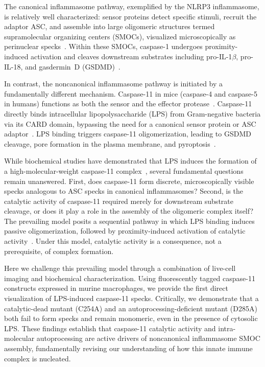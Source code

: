 \documentclass[11pt,a4paper]{article}
\begin{document}
The canonical inflammasome pathway, exemplified by the NLRP3 inflammasome, is relatively well characterized: sensor proteins detect specific stimuli, recruit the adaptor ASC, and assemble into large oligomeric structures termed supramolecular organizing centers (SMOCs), visualized microscopically as perinuclear specks~\citep{broz2016, man2017}. Within these SMOCs, caspase-1 undergoes proximity-induced activation and cleaves downstream substrates including pro-IL-1$\beta$, pro-IL-18, and gasdermin~D (GSDMD)~\citep{shi2015, he2015}.

In contrast, the noncanonical inflammasome pathway is initiated by a fundamentally different mechanism. Caspase-11 in mice (caspase-4 and caspase-5 in humans) functions as both the sensor and the effector protease~\citep{kayagaki2011, shi2014, hagar2013}. Caspase-11 directly binds intracellular lipopolysaccharide (LPS) from Gram-negative bacteria via its CARD domain, bypassing the need for a canonical sensor protein or ASC adaptor~\citep{shi2014}. LPS binding triggers caspase-11 oligomerization, leading to GSDMD cleavage, pore formation in the plasma membrane, and pyroptosis~\citep{kayagaki2015, shi2015, liu2016, ding2016}.

While biochemical studies have demonstrated that LPS induces the formation of a high-molecular-weight caspase-11 complex~\citep{shi2014, ross2022}, several fundamental questions remain unanswered. First, does caspase-11 form discrete, microscopically visible specks analogous to ASC specks in canonical inflammasomes? Second, is the catalytic activity of caspase-11 required merely for downstream substrate cleavage, or does it play a role in the assembly of the oligomeric complex itself? The prevailing model posits a sequential pathway in which LPS binding induces passive oligomerization, followed by proximity-induced activation of catalytic activity~\citep{broz2016}. Under this model, catalytic activity is a consequence, not a prerequisite, of complex formation.

Here we challenge this prevailing model through a combination of live-cell imaging and biochemical characterization. Using fluorescently tagged caspase-11 constructs expressed in murine macrophages, we provide the first direct visualization of LPS-induced caspase-11 specks. Critically, we demonstrate that a catalytic-dead mutant (C254A) and an autoprocessing-deficient mutant (D285A) both fail to form specks and remain monomeric, even in the presence of cytosolic LPS. These findings establish that caspase-11 catalytic activity and intra-molecular autoprocessing are active drivers of noncanonical inflammasome SMOC assembly, fundamentally revising our understanding of how this innate immune complex is nucleated.
\end{document}
